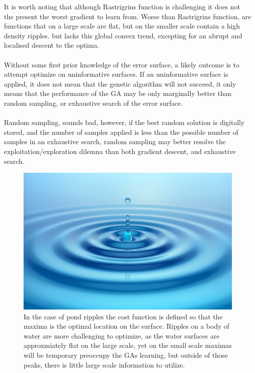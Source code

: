    It is worth noting that although Rastrigrins function is challenging it does not the present the worst gradient to learn from. Worse than Rastrigrins function, are functions that on a large scale are flat, but on the smaller scale contain a high density ripples.
   but lacks this global convex trend, excepting for an abrupt and localised descent to the optima.\\ 
   \\
   Without some first prior knowledge of the error surface, a likely outcome is to attempt optimize on uninformative surfaces. If an uninformative surface is applied, it does not mean that the genetic algorithm will not succeed, it only means that the performance of the GA may be only marginally better than random sampling, or exhaustive search of the error surface.\\
   \\
   Random sampling, sounds bad, however, if the best random solution is digitally stored, and the number of samples applied is less than the possible number of samples in an exhaustive search, random sampling may better resolve the exploitation/exploration dilemna than both gradient descent, and exhaustive search.
      \begin{figure}

   \includegraphics[]{figures/pond_ripple_surface.png}
     \caption{In the case of pond ripples the cost function is defined so that the maxima is the optimal location on the surface. Ripples on a body of water are more challenging to optimize, as the water surfaces are approxmiately flat on the large scale, yet on the small scale maximas will be temporary preoccupy the GAs learning, but outside of those peaks, there is little large scale information to utilize. }

      \end{figure}


